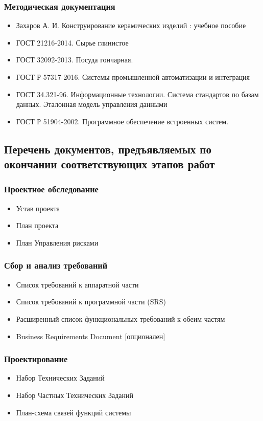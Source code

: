 \documentclass[16pt,a4paper]{article}
\begin{document}
\subsubsection{Методическая документация}
\begin{itemize}
    \item Захаров А. И. Конструирование керамических изделий : учебное пособие
    \item ГОСТ 21216-2014. Сырье глинистое
    \item ГОСТ 32092-2013. Посуда гончарная.
    \item ГОСТ Р 57317-2016. Системы промышленной автоматизации и интеграция
    \item ГОСТ 34.321-96. Информационные технологии. Система стандартов по базам данных. Эталонная модель управления данными
    \item ГОСТ Р 51904-2002. Программное обеспечение встроенных систем.
\end{itemize}
\subsection{Перечень документов, предъявляемых по окончании соответствующих этапов работ}
\subsubsection{Проектное обследование}
\begin{itemize}
    \item Устав проекта
    \item План проекта
    \item План Управления рисками
\end{itemize}
\subsubsection{Сбор и анализ требований}
\begin{itemize}
    \item Список требований к аппаратной части
    \item Список требований к программной части (SRS)
    \item Расширенный список функциональных требований к обеим частям
    \item Business Requirements Document [опционален]
\end{itemize}
\subsubsection{Проектирование}
\begin{itemize}
    \item Набор Технических Заданий
    \item Набор Частных Технических Заданий
    \item План-схема связей функций системы
\end{itemize}
\end{document}

